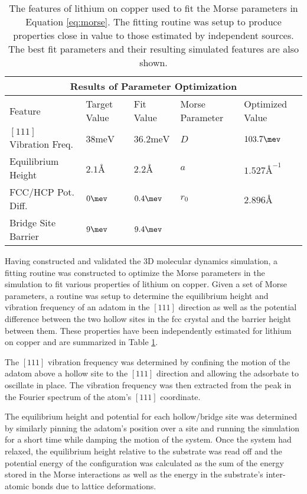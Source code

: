 \begin{table}[h!]
	\centering
\begin{tabular}{ |p{3.5cm}|p{2.1cm}|p{1.8cm}||p{2.8cm}|p{2.8cm}|}
 \hline
 \multicolumn{5}{|c|}{Results of Parameter Optimization} \\
 \hline
	Feature & Target Value & Fit Value & Morse Parameter & Optimized Value \\
 \hline
	$\left[111\right]$ Vibration Freq. & $38\si{\milli\eV}$ \cite{livibfreq} & $36.2\si{\milli\eV}$ & $D$ & $103.7\mev$ \\
	Equilibrium Height & $2.1\si{\angstrom}$ \cite{PADILLACAMPOS1997183} & $2.2\si{\angstrom}$ & $a$ & $1.527\si{\angstrom}^{-1}$ \\
	FCC/HCP Pot. Diff. & $0\mev$ \cite{Guido,Ward} & $0.4\mev$ & $r_0$ & $2.896\si{\angstrom}$ \\
	Bridge Site Barrier & $9\mev$ \cite{PADILLACAMPOS1997183, Ward} & $9.4\mev$ & & \\
 \hline
\end{tabular}
	\caption{The features of lithium on copper used to fit the Morse parameters in Equation \ref{eq:morse}. The fitting routine was setup to produce properties close in value to those estimated by independent sources. The best fit parameters and their resulting simulated features are also shown.} 
\label{table:fit_parameters}
\end{table}

Having constructed and validated the 3D molecular dynamics simulation, a fitting routine was constructed to optimize the Morse parameters in the simulation to fit various properties of lithium on copper. Given a set of Morse parameters, a routine was setup to determine the equilibrium height and vibration frequency of an adatom in the $\left[111\right]$ direction as well as the potential difference between the two hollow sites in the fcc crystal and the barrier height between them. These properties have been independently estimated for lithium on copper and are summarized in Table \ref{table:fit_parameters}. 

The $\left[111\right]$ vibration frequency was determined by confining the motion of the adatom above a hollow site to the $\left[111\right]$ direction and allowing the adsorbate to oscillate in place. The vibration frequency was then extracted from the peak in the Fourier spectrum of the atom's $\left[111\right]$ coordinate.

The equilibrium height and potential for each hollow/bridge site was determined by similarly pinning the adatom's position over a site and running the simulation for a short time while damping the motion of the system. Once the system had relaxed, the equilibrium height relative to the substrate was read off and the potential energy of the configuration was calculated as the sum of the energy stored in the Morse interactions as well as the energy in the substrate's inter-atomic bonds due to lattice deformations.

